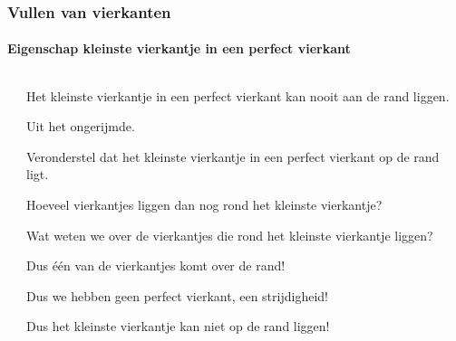 \begin{frame}
  \frametitle{Vullen van vierkanten}
  \framesubtitle{Eigenschap kleinste vierkantje in een perfect vierkant}
  \begin{columns}
    \begin{column}{0.5\textwidth}
      
    \end{column}
    \begin{column}{0.5\textwidth}
    {\scriptsize
      \begin{stelling}
      Het kleinste vierkantje in een perfect vierkant kan nooit aan de rand liggen.
      \end{stelling}
      {\tiny
        \begin{list}{}{\leftmargin=0pt}
          \pause
          \item Uit het ongerijmde.
          \item Veronderstel dat het kleinste vierkantje in een perfect vierkant op de rand ligt.
          \pause
          \item Hoeveel vierkantjes liggen dan nog rond het kleinste vierkantje?
          \item Wat weten we over de vierkantjes die rond het kleinste vierkantje liggen?
          \pause
          \item Dus één van de vierkantjes komt over de rand!
          \pause
          \item Dus we hebben geen perfect vierkant, een strijdigheid!
          \item Dus het kleinste vierkantje kan niet op de rand liggen!
        \end{list}
      }
    }
    \end{column}
  \end{columns}  
\end{frame}

